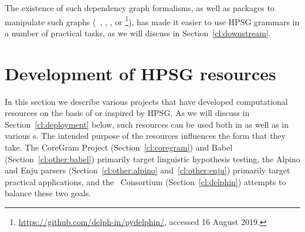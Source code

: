\documentclass[output=paper
	        ,collection
	        ,collectionchapter
 	        ,biblatex
                ,babelshorthands
                ,newtxmath
                ,draftmode
                ,colorlinks, citecolor=brown
]{langscibook}
\begin{document}
The existence of such dependency graph formalisms,
as well as  packages to manipulate such graphs (\eg\ \citealt{ivanova2012dm}, \citealt{copestake2016pydmrs}, \citealt{Her:Kuh:Oep:19}, or \footnote{\url{https://github.com/delph-in/pydelphin/}, accessed 16 August 2019.}),
has made it easier to use HPSG grammars in a number of practical tasks,
as we will discuss in Section~\ref{cl:downstream}.








\section{Development of HPSG resources}
\label{cl:resources}


In this section we describe various projects that have developed computational resources on the basis of or inspired by HPSG.
As we will discuss in Section~\ref{cl:deployment} below,
such resources can be used both in  as well as in various s.
The intended purpose of the resources influences the form that they take.
The CoreGram Project (Section~\ref{cl:coregram}) and Babel (Section~\ref{cl:other:babel}) primarily target linguistic hypothesis testing,
the Alpino and Enju parsers (Section~\ref{cl:other:alpino} and~\ref{cl:other:enju}) primarily target practical applications,
and the \delphin\ Consortium (Section~\ref{cl:delphin}) attempts to balance these two goals.
\end{document}
